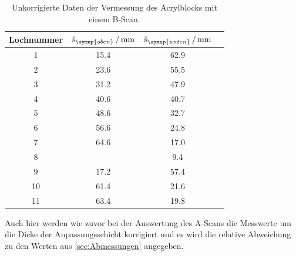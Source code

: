   \begin{table}[H]
    \centering
    \caption{Unkorrigierte Daten der Vermessung des Acrylblocks mit einem B-Scan.}
    \label{tab:b-scan}
    \begin{tabular}{S[table-format=2.0] S[table-format=2.1] S[table-format=2.1] S[table-format=2.1]}
        \toprule
         {Lochnummer} & {$\tilde{s}_{\symup{oben}}\,/\,\unit{\milli\metre}$} & {$\tilde{s}_{\symup{unten}}\,/\,\unit{\milli\metre}$} \\
        	& 15.4 & 62.9 \\
         2	& 23.6 & 55.5 \\
         3	& 31.2 & 47.9 \\
         4	& 40.6 & 40.7 \\
         5	& 48.6 & 32.7 \\
         6	& 56.6 & 24.8 \\
         7	& 64.6 & 17.0 \\
         8	& {}   &  9.4 \\
         9	& 17.2 & 57.4 \\
         10	& 61.4 & 21.6 \\
         11	& 63.4 & 19.8 \\
        \bottomrule 
    \end{tabular}
  \end{table}

  Auch hier werden wie zuvor bei der Auswertung des A-Scans die Messwerte um die Dicke der Anpassungsschicht korrigiert und es wird die 
  relative Abweichung zu den Werten aus \ref{sec:Abmessungen} angegeben.

